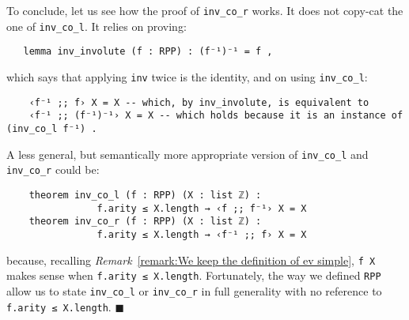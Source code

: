 \documentclass[runningheads]{llncs}
\newcommand*{\qeda}{\hfill\ensuremath{\blacksquare}}%
\begin{document}
\vspace{\baselineskip}
To conclude, let us see how the proof of \lstinline|inv_co_r| works. It does not copy-cat the one of \lstinline|inv_co_l|. It relies on proving:
\begin{lstlisting}
   lemma inv_involute (f : RPP) : (f⁻¹)⁻¹ = f ,
\end{lstlisting}
\noindent
which says that applying \lstinline|inv| twice is the identity, and on using \lstinline|inv_co_l|:
\begin{lstlisting}
    ‹f⁻¹ ;; f› X = X -- which, by inv_involute, is equivalent to
    ‹f⁻¹ ;; (f⁻¹)⁻¹› X = X -- which holds because it is an instance of (inv_co_l f⁻¹) .
\end{lstlisting}

\begin{remark}
\label{remark:On our simplifying choices on ev}
A less general, but semantically more appropriate version of  \lstinline|inv_co_l| and \lstinline|inv_co_r| could be:
\begin{lstlisting}
    theorem inv_co_l (f : RPP) (X : list ℤ) :
                f.arity ≤ X.length → ‹f ;; f⁻¹› X = X
    theorem inv_co_r (f : RPP) (X : list ℤ) :
                f.arity ≤ X.length → ‹f⁻¹ ;; f› X = X
\end{lstlisting}
because, recalling \textit{Remark}~\ref{remark:We keep the definition of ev simple}, \lstinline|f X| makes sense when \lstinline|f.arity ≤ X.length|.
Fortunately, the way we defined \lstinline|RPP| allow us to state \lstinline|inv_co_l| or \lstinline|inv_co_r| in full generality
with no reference to \lstinline|f.arity ≤ X.length|.
\qeda
\end{remark}

\end{document}

